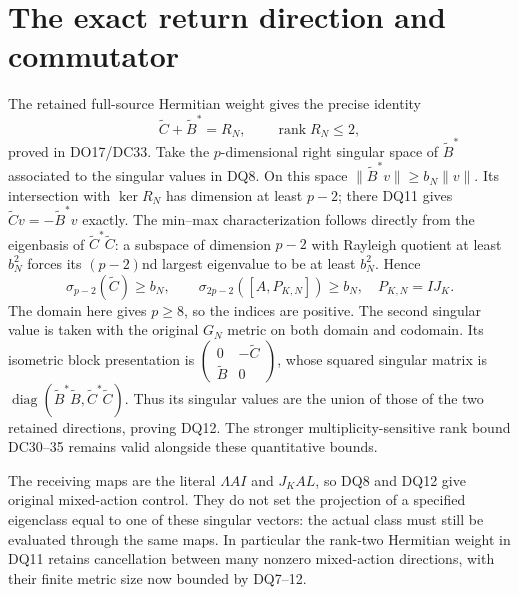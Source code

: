\documentclass[11pt]{article}
\DeclareMathOperator{\rank}{rank}
\DeclareMathOperator{\diag}{diag}
\begin{document}
\section{The exact return direction and commutator}
The retained full-source Hermitian weight gives the precise identity
\[
 \widetilde C+\widetilde B^*=R_N,\qquad\rank R_N\le2,
 \tag{DQ11}
\]
proved in DO17/DC33. Take the $p$-dimensional right singular space of
$\widetilde B^*$ associated to the singular values in DQ8.
On this space $\|\widetilde B^*v\|\ge b_N\|v\|$.
Its intersection with $\ker R_N$ has dimension at least $p-2$;
there DQ11 gives $\widetilde Cv=-\widetilde B^*v$ exactly.
The min--max characterization follows directly from the eigenbasis of
$\widetilde C^*\widetilde C$: a subspace of dimension $p-2$
with Rayleigh quotient at least $b_N^2$ forces its $(p-2)$nd largest
eigenvalue to be at least $b_N^2$. Hence
\[
 \boxed{\sigma_{p-2}(\widetilde C)\ge b_N,
 \qquad \sigma_{2p-2}([A,P_{K,N}])\ge b_N,}
 \quad P_{K,N}=IJ_K.\tag{DQ12}
\]
The domain here gives $p\ge8$, so the indices are positive.
The second singular value is taken with the original $G_N$ metric
on both domain and codomain. Its isometric block presentation is
$\left(\begin{smallmatrix}0&-\widetilde C\\\widetilde B&0\end{smallmatrix}\right)$,
whose squared singular matrix is
$\diag(\widetilde B^*\widetilde B,\widetilde C^*\widetilde C)$.
Thus its singular values are the union of those of the two retained
directions, proving DQ12. The stronger multiplicity-sensitive rank
bound DC30--35 remains valid alongside these quantitative bounds.

The receiving maps are the literal $\Lambda AI$ and $J_KAL$, so
DQ8 and DQ12 give original mixed-action control. They do not set
the projection of a specified eigenclass equal to one of these singular
vectors: the actual class must still be evaluated through the same maps.
In particular the rank-two Hermitian weight in DQ11 retains cancellation
between many nonzero mixed-action directions, with their finite metric
size now bounded by DQ7--12.
\end{document}
